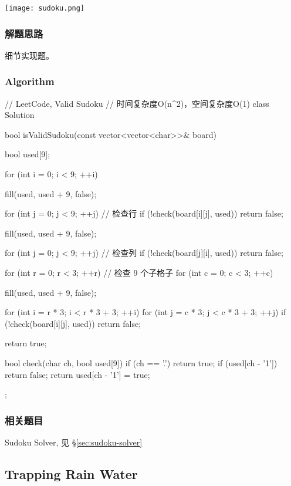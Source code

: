 \begin{center}
	\texttt{[image: sudoku.png]}\\
	\label{fig:sudoku}
\end{center}

\subsubsection{解题思路}
细节实现题。


\subsubsection{Algorithm}
\begin{Code}
	// LeetCode, Valid Sudoku
	// 时间复杂度O(n^2)，空间复杂度O(1)
	class Solution {
		bool isValidSudoku(const vector<vector<char>>& board) {
			bool used[9];
			
			for (int i = 0; i < 9; ++i) {
				fill(used, used + 9, false);
				
				for (int j = 0; j < 9; ++j) // 检查行
					if (!check(board[i][j], used))
						return false;
				
				fill(used, used + 9, false);
				
				for (int j = 0; j < 9; ++j) // 检查列
					if (!check(board[j][i], used))
						return false;
			}
			
			for (int r = 0; r < 3; ++r) // 检查 9 个子格子
				for (int c = 0; c < 3; ++c) {
					fill(used, used + 9, false);
				
					for (int i = r * 3; i < r * 3 + 3; ++i)
						for (int j = c * 3; j < c * 3 + 3; ++j)
							if (!check(board[i][j], used))
								return false;
				}
				return true;
		}
		
		bool check(char ch, bool used[9]) {
			if (ch == '.') return true;
			if (used[ch - '1']) return false;
			return used[ch - '1'] = true;
		}
	};
\end{Code}


\subsubsection{相关题目}
\begindot
\item Sudoku Solver, 见 \S \ref{sec:sudoku-solver}
\myenddot


\subsection{Trapping Rain Water} %
\label{sec:trapping-rain-water}


